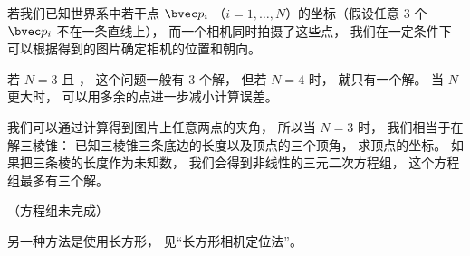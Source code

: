 
\begin{issues}
\issueDraft
\end{issues}


若我们已知世界系中若干点 $\bvec p_i$ （$i = 1, \dots, N$）的坐标（假设任意 3 个 $\bvec p_i$ 不在一条直线上）， 而一个相机同时拍摄了这些点， 我们在一定条件下可以根据得到的图片确定相机的位置和朝向。

若 $N = 3$ 且 ， 这个问题一般有 3 个解， 但若 $N = 4$ 时， 就只有一个解。 当 $N$ 更大时， 可以用多余的点进一步减小计算误差。

我们可以通过计算得到图片上任意两点的夹角， 所以当 $N = 3$ 时， 我们相当于在解三棱锥： 已知三棱锥三条底边的长度以及顶点的三个顶角， 求顶点的坐标。 如果把三条棱的长度作为未知数， 我们会得到非线性的三元二次方程组， 这个方程组最多有三个解。

（方程组未完成）

另一种方法是使用长方形， 见“长方形相机定位法”。
